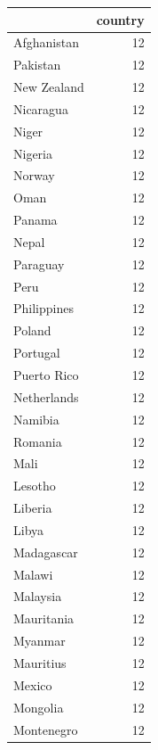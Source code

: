 \documentclass[
  letterpaper,
  DIV=11,
  numbers=noendperiod]{scrreprt}
\begin{document}
\begin{tabular}{lr}
\toprule
{} &  country \\
\midrule
Afghanistan              &       12 \\
Pakistan                 &       12 \\
New Zealand              &       12 \\
Nicaragua                &       12 \\
Niger                    &       12 \\
Nigeria                  &       12 \\
Norway                   &       12 \\
Oman                     &       12 \\
Panama                   &       12 \\
Nepal                    &       12 \\
Paraguay                 &       12 \\
Peru                     &       12 \\
Philippines              &       12 \\
Poland                   &       12 \\
Portugal                 &       12 \\
Puerto Rico              &       12 \\
Netherlands              &       12 \\
Namibia                  &       12 \\
Romania                  &       12 \\
Mali                     &       12 \\
Lesotho                  &       12 \\
Liberia                  &       12 \\
Libya                    &       12 \\
Madagascar               &       12 \\
Malawi                   &       12 \\
Malaysia                 &       12 \\
Mauritania               &       12 \\
Myanmar                  &       12 \\
Mauritius                &       12 \\
Mexico                   &       12 \\
Mongolia                 &       12 \\
Montenegro               &       12 \\

\end{tabular}
\end{document}

